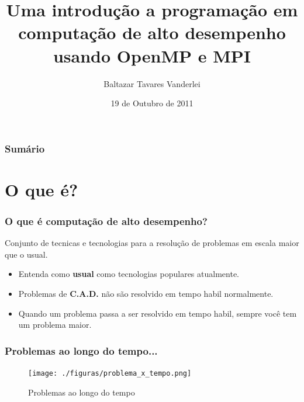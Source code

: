 \documentclass[10pt]{beamer}
\title[]{Uma introdução a programação em computação de alto desempenho usando \textbf{OpenMP} e \textbf{MPI}}
\author[]{Baltazar Tavares Vanderlei}
\date{19 de Outubro de 2011}
\institute[2011]{Laboratório de Computação Científica e Visualização - LCCV/UFAL}
\begin{document}
\newcommand{\til}{\~{}}

\frame{\titlepage}
	\begin{frame}[t]
	\frametitle{Sumário}
	\tableofcontents[framebreaks]
\end{frame}



\section{O que é?}
	\begin{frame}%
	\frametitle{O que é computação de alto desempenho?}
		\text Conjunto de tecnicas e tecnologias para a resolução de problemas em escala maior que o usual.
		\pause
		\begin{itemize}[<+->]
			\item Entenda como \textbf{usual} como tecnologias populares atualmente.
			\item Problemas de \textbf{C.A.D.} não são resolvido em tempo habil normalmente.
			\item Quando um problema passa a ser resolvido em tempo habil, sempre você tem um problema maior.
		\end{itemize}
	\end{frame}

	\begin{frame}%
	\frametitle{Problemas ao longo do tempo...}
		\begin{figure}
		\centering
			\texttt{[image: ./figuras/problema\_x\_tempo.png]}
			\caption{Problemas ao longo do tempo}
		\end{figure}
	\end{frame}
\end{document}
